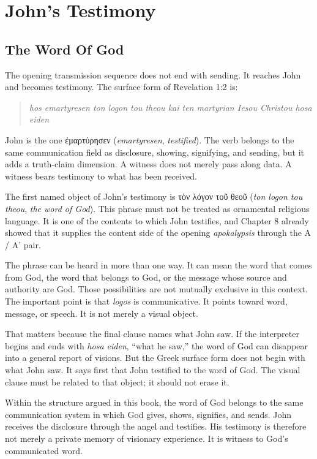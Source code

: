 \chapter{John's Testimony}

\section{The Word Of God}

The opening transmission sequence does not end with sending. It reaches John and becomes testimony. The surface form of Revelation 1:2 is:

\begin{quote}
\textit{hos emartyresen ton logon tou theou kai ten martyrian Iesou Christou hosa eiden}
\end{quote}

John is the one \textgreek{ἐμαρτύρησεν} (\textit{emartyresen}, \textit{testified}). The verb belongs to the same communication field as disclosure, showing, signifying, and sending, but it adds a truth-claim dimension. A witness does not merely pass along data. A witness bears testimony to what has been received.

The first named object of John's testimony is \textgreek{τὸν λόγον τοῦ θεοῦ} (\textit{ton logon tou theou}, \textit{the word of God}). This phrase must not be treated as ornamental religious language. It is one of the contents to which John testifies, and Chapter 8 already showed that it supplies the content side of the opening \textit{apokalypsis} through the A / A' pair.

The phrase can be heard in more than one way. It can mean the word that comes from God, the word that belongs to God, or the message whose source and authority are God. Those possibilities are not mutually exclusive in this context. The important point is that \textit{logos} is communicative. It points toward word, message, or speech. It is not merely a visual object.

That matters because the final clause names what John saw. If the interpreter begins and ends with \textit{hosa eiden}, ``what he saw,'' the word of God can disappear into a general report of visions. But the Greek surface form does not begin with what John saw. It says first that John testified to the word of God. The visual clause must be related to that object; it should not erase it.

Within the structure argued in this book, the word of God belongs to the same communication system in which God gives, shows, signifies, and sends. John receives the disclosure through the angel and testifies. His testimony is therefore not merely a private memory of visionary experience. It is witness to God's communicated word.

